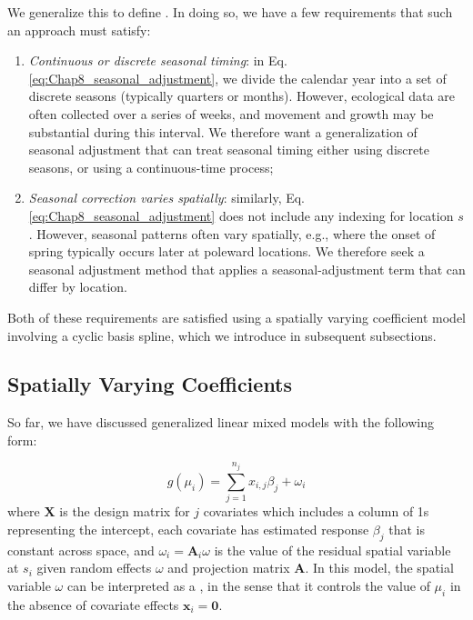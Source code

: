 We generalize this to define . In doing so, we have a few requirements that such an approach must satisfy:
\begin{enumerate}
    \item \textit{Continuous or discrete seasonal timing}:  in Eq. \ref{eq:Chap8_seasonal_adjustment}, we divide the calendar year into a set of discrete seasons (typically quarters or months).  However, ecological data are often collected over a series of weeks, and movement and growth may be substantial during this interval.  We therefore want a generalization of seasonal adjustment that can treat seasonal timing either using discrete seasons, or using a continuous-time process;

    \item \textit{Seasonal correction varies spatially}:  similarly, Eq. \ref{eq:Chap8_seasonal_adjustment} does not include any indexing for location \(s\).  However, seasonal patterns often vary spatially, e.g., where the onset of spring typically occurs later at poleward locations.  We therefore seek a seasonal adjustment method that applies a seasonal-adjustment term that can differ by location.   
\end{enumerate}
Both of these requirements are satisfied using a spatially varying coefficient model involving a cyclic basis spline, which we introduce in subsequent subsections.

\subsection{Spatially Varying Coefficients} \label{sec:Chap8_SVC}

So far, we have discussed generalized linear mixed models with the following form:

\begin{equation}
    g(\mu_i) = \sum_{j=1}^{n_j} x_{i,j} \beta_j + \omega_i
\end{equation}
where \( \mathbf X \) is the design matrix for \(j\) covariates which includes a column of 1s representing the intercept, each covariate has estimated response \( \beta_j \) that is constant across space, and \( \omega_i = \mathbf A_i \omega \) is the value of the residual spatial variable at \(s_i\) given random effects \(\omega\) and projection matrix \(\mathbf A\).  In this model, the spatial variable \( \omega \) can be interpreted as a , in the sense that it controls the value of \( \mu_i \) in the absence of covariate effects \( \mathbf x_{i} = \mathbf 0 \).  


